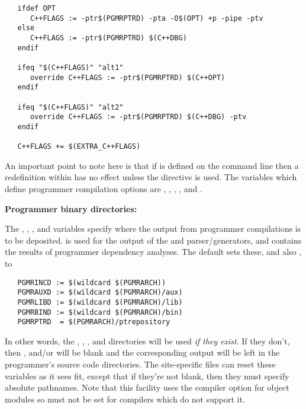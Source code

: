\begin{verbatim}
   ifdef OPT
      C++FLAGS := -ptr$(PGMRPTRD) -pta -O$(OPT) +p -pipe -ptv
   else
      C++FLAGS := -ptr$(PGMRPTRD) $(C++DBG)
   endif
 
   ifeq "$(C++FLAGS)" "alt1"
      override C++FLAGS := -ptr$(PGMRPTRD) $(C++OPT)
   endif
 
   ifeq "$(C++FLAGS)" "alt2"
      override C++FLAGS := -ptr$(PGMRPTRD) $(C++DBG) -ptv
   endif
 
   C++FLAGS += $(EXTRA_C++FLAGS)
\end{verbatim}
 
\noindent
An important point to note here is that if  is defined on the
command line then a redefinition within  has no effect unless
the  directive is used.  The variables which define programmer
compilation options are , , ,
, and .
 
\textbf{Programmer binary directories:}
 
The , , , and 
variables specify where the output from programmer compilations is to be
deposited.   is used for the output of the  and
 parser/generators, and  contains the results of
programmer dependency analyses.  The default  sets these, and
also , to
 
\begin{verbatim}
   PGMRINCD := $(wildcard $(PGMRARCH))
   PGMRAUXD := $(wildcard $(PGMRARCH)/aux)
   PGMRLIBD := $(wildcard $(PGMRARCH)/lib)
   PGMRBIND := $(wildcard $(PGMRARCH)/bin)
   PGMRPTRD  = $(PGMRARCH)/ptrepository
\end{verbatim}
 
\noindent
In other words, the , ,
, and  directories will be used
{\em if they exist}.  If they don't, then , 
and/or  will be blank and the corresponding output will be
left in the programmer's source code directories.  The site-specific
 files can reset these variables as it sees fit, except that
if they're not blank, then they must specify absolute pathnames.  Note that
this facility uses the  compiler option for object modules so
 must not be set for compilers which do not support it.
 
